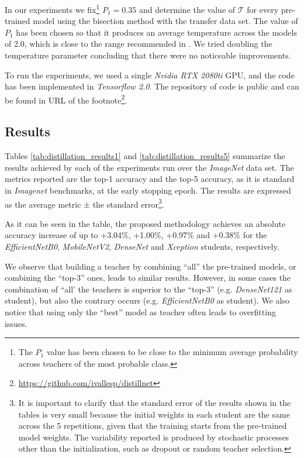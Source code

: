In our experiments we fix\footnote{The $P_1$ value has been chosen to be close to the minimum average probability across teachers of the most probable class.} $P_1=0.35$ and determine the value of $\mathcal{T}$ for every pre-trained model using the bisection method with the transfer data set. The value of $P_1$ has been chosen so that it produces an average temperature across the models of 2.0, which is close to the range recommended in \autocite{hinton2015}. We tried doubling the temperature parameter concluding that there were no noticeable improvements.

To run the experiments, we used a single \textit{Nvidia RTX 2080ti} GPU, and the code has been implemented in \textit{Tensorflow 2.0}. The repository of code is public and can be found in URL of the footnote\footnote{\url{https://github.com/ivallesp/distillnet}}.

\subsection{Results}  \label{sec:distillation_results}
Tables \ref{tab:distillation_results1} and \ref{tab:distillation_results5} summarize the results achieved by each of the experiments run over the \textit{ImageNet} data set. The metrics reported are the top-1 accuracy and the top-5 accuracy, as it is standard in \textit{Imagenet} benchmarks, at the early stopping epoch. The results are expressed as the average metric $\pm$ the standard error\footnote{It is important to clarify that the standard error of the results shown in the tables is very small because the initial weights in each student are the same across the 5 repetitions, given that the training starts from the pre-trained model weights. The variability reported is produced by stochastic processes other than the initialization, such as dropout or random teacher selection.}.

As it can be seen in the table, the proposed methodology achieves an absolute accuracy increase of up to +3.04\%, +1.00\%, +0.97\% and +0.38\% for the \textit{EfficientNetB0}, \textit{MobileNetV2},  \textit{DenseNet} and \textit{Xception} students, respectively.

We observe that building a teacher by combining ``all'' the pre-trained models, or combining the ``top-3'' ones, leads to similar results. However, in some cases the combination of ``all' the teachers is superior to the ``top-3'' (e.g. \textit{DenseNet121} as student), but also the contrary occurs (e.g. \textit{EfficientNetB0} as student). We also notice that using only the ``best'' model as teacher often leads to overfitting issues.

